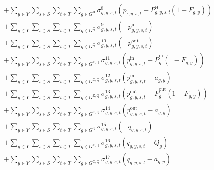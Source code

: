 \documentclass{article}
\newcommand{\sGeneratorsHydro}{G^{\mathrm{H}}}
\newcommand{\sStorage}{G^{\mathrm{Q}}}
\newcommand{\sStorageExisting}{G^{\mathrm{E,Q}}}
\newcommand{\sStorageCandidate}{G^{\mathrm{C,Q}}}
\newcommand{\sYears}{Y}
\newcommand{\sScenarios}{S}
\newcommand{\sIntervals}{T}
\newcommand{\iGenerator}{g}
\newcommand{\iYear}{y}
\newcommand{\iScenario}{s}
\newcommand{\iInterval}{t}
\newcommand{\cPowerChargingMax}[1][\iGenerator]{\overline{P}^{\mathrm{in}}_{#1}}
\newcommand{\cPowerDischargingMax}[1][\iGenerator]{\overline{P}^{\mathrm{out}}_{#1}}
\newcommand{\cStorageUnitEnergyMax}[1][\iGenerator]{\overline{Q}_{#1}}
\newcommand{\cRetirementIndicator}[1][\iGenerator,\iYear]{F_{#1}}
\newcommand{\cPowerOutputHydro}[1][\iGenerator,\iYear,\iScenario,\iInterval]{P^{\mathrm{H}}_{#1}}
\newcommand{\vPower}[1][\iGenerator,\iYear,\iScenario,\iInterval]{p_{#1}}
\newcommand{\vPowerIn}[1][\iGenerator,\iYear,\iScenario,\iInterval]{p^{\mathrm{in}}_{#1}}
\newcommand{\vPowerOut}[1][\iGenerator,\iYear,\iScenario,\iInterval]{p^{\mathrm{out}}_{#1}}
\newcommand{\vStorageUnitEnergy}[1][\iGenerator,\iYear,\iScenario,\iInterval]{q_{#1}}
\newcommand{\vInstalledCapacityTotal}[1][\iGenerator,\iYear]{a_{#1}}
\newcommand{\dMaxPowerOutputHydro}[1][\iGenerator,\iYear,\iScenario,\iInterval]{\sigma_{#1}^{8}}
\newcommand{\dNonNegativeCharging}[1][\iGenerator,\iYear,\iScenario,\iInterval]{\sigma_{#1}^{9}}
\newcommand{\dNonNegativeDischarging}[1][\iGenerator,\iYear,\iScenario,\iInterval]{\sigma_{#1}^{10}}
\newcommand{\dMaxChargingRateExisting}[1][\iGenerator,\iYear,\iScenario,\iInterval]{\sigma_{#1}^{11}}
\newcommand{\dMaxChargingRateCandidate}[1][\iGenerator,\iYear,\iScenario,\iInterval]{\sigma_{#1}^{12}}
\newcommand{\dMaxDischargingRateExisting}[1][\iGenerator,\iYear,\iScenario,\iInterval]{\sigma_{#1}^{13}}
\newcommand{\dMaxDischargingRateCandidate}[1][\iGenerator,\iYear,\iScenario,\iInterval]{\sigma_{#1}^{14}}
\newcommand{\dNonNegativeStorageEnergy}[1][\iGenerator,\iYear,\iScenario,\iInterval]{\sigma_{#1}^{15}}
\newcommand{\dMaxStorageEnergyExisting}[1][\iGenerator,\iYear,\iScenario,\iInterval]{\sigma_{#1}^{16}}
\newcommand{\dMaxStorageEnergyCandidate}[1][\iGenerator,\iYear,\iScenario,\iInterval]{\sigma_{#1}^{17}}
\begin{document}
\begin{align}
		& + \sum\limits_{\iYear \in \sYears}\sum\limits_{\iScenario \in \sScenarios}\sum\limits_{\iInterval \in \sIntervals} \sum\limits_{\iGenerator \in \sGeneratorsHydro} \dMaxPowerOutputHydro \left(\vPower - \cPowerOutputHydro \left(1 - \cRetirementIndicator\right) \right)\\
		& + \sum\limits_{\iYear \in \sYears}\sum\limits_{\iScenario \in \sScenarios}\sum\limits_{\iInterval \in \sIntervals} \sum\limits_{\iGenerator \in \sStorage} \dNonNegativeCharging \left(-\vPowerIn\right)\\
		& + \sum\limits_{\iYear \in \sYears}\sum\limits_{\iScenario \in \sScenarios}\sum\limits_{\iInterval \in \sIntervals} \sum\limits_{\iGenerator \in \sStorage} \dNonNegativeDischarging \left(-\vPowerOut\right)\\
		& + \sum\limits_{\iYear \in \sYears}\sum\limits_{\iScenario \in \sScenarios}\sum\limits_{\iInterval \in \sIntervals} \sum\limits_{\iGenerator \in \sStorageExisting} \dMaxChargingRateExisting \left(\vPowerIn - \cPowerChargingMax \left(1 - \cRetirementIndicator\right) \right)\\
		& + \sum\limits_{\iYear \in \sYears}\sum\limits_{\iScenario \in \sScenarios}\sum\limits_{\iInterval \in \sIntervals} \sum\limits_{\iGenerator \in \sStorageCandidate} \dMaxChargingRateCandidate \left(\vPowerIn - \vInstalledCapacityTotal\right)\\
		& + \sum\limits_{\iYear \in \sYears}\sum\limits_{\iScenario \in \sScenarios}\sum\limits_{\iInterval \in \sIntervals} \sum\limits_{\iGenerator \in \sStorageExisting} \dMaxDischargingRateExisting \left(\vPowerOut - \cPowerDischargingMax \left(1 - \cRetirementIndicator\right)\right)\\
		& + \sum\limits_{\iYear \in \sYears}\sum\limits_{\iScenario \in \sScenarios}\sum\limits_{\iInterval \in \sIntervals} \sum\limits_{\iGenerator \in \sStorageCandidate} \dMaxDischargingRateCandidate \left(\vPowerOut - \vInstalledCapacityTotal\right)\\
		& + \sum\limits_{\iYear \in \sYears}\sum\limits_{\iScenario \in \sScenarios}\sum\limits_{\iInterval \in \sIntervals} \sum\limits_{\iGenerator \in \sStorage} \dNonNegativeStorageEnergy \left(- \vStorageUnitEnergy\right)\\
		& + \sum\limits_{\iYear \in \sYears}\sum\limits_{\iScenario \in \sScenarios}\sum\limits_{\iInterval \in \sIntervals} \sum\limits_{\iGenerator \in \sStorageExisting} \dMaxStorageEnergyExisting \left(\vStorageUnitEnergy - \cStorageUnitEnergyMax\right)\\
		& + \sum\limits_{\iYear \in \sYears}\sum\limits_{\iScenario \in \sScenarios}\sum\limits_{\iInterval \in \sIntervals} \sum\limits_{\iGenerator \in \sStorageCandidate} \dMaxStorageEnergyCandidate \left(\vStorageUnitEnergy - \vInstalledCapacityTotal\right)\\

\end{align}
\end{document}
